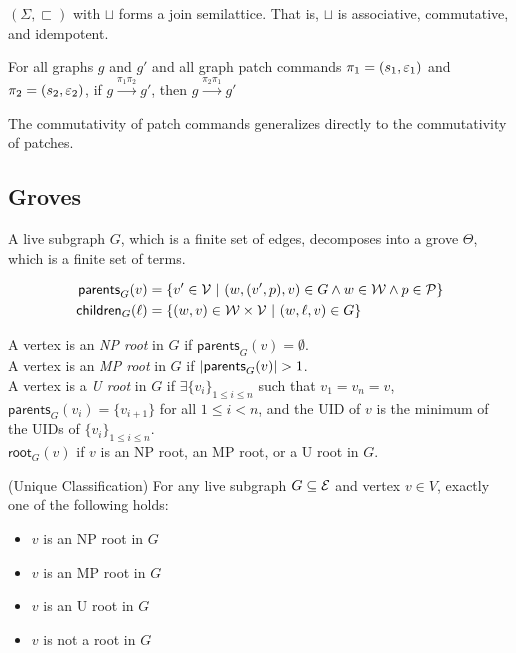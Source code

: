 \begin{lemma}
  \label{lem:Join Semilattice}
  $(\Sigma, \sqsubset)$ with $\sqcup$ forms a join semilattice. That is, $\sqcup$ is associative, commutative, and idempotent. 
\end{lemma}

\begin{theorem}[Commutativity]
  \label{thm:Commutativity}
  For all graphs $g$ and $g'$ and all graph patch commands $\pi_1 = (s_1, \varepsilon_1)$ and  $\pi_2 = (s_2, \varepsilon_2)$, 
  if $g \overset{\pi_1 \pi_2}{\longrightarrow} g'$,
  then $g \overset{\pi_2 \pi_1}{\longrightarrow} g'$
\end{theorem}

The commutativity of patch commands generalizes directly to the commutativity of patches. 

\subsection{Groves}

\figureTermSyntaxContent

A live subgraph $G$, which is a finite set of edges, decomposes into a grove $\Theta$, which is a finite set of terms.


\begin{align*}
    \mathsf{parents}_{G}(v) &= \left\{v' \in \mathcal{V} ~\vert~(w, (v', p), v) \in G \land w \in \mathcal{W} \land p \in \mathcal{P}\right\}\\
    \mathsf{children}_{G}(\ell) &= \left\{(w,v) \in \mathcal{W}\times\mathcal{V} ~\vert~(w, \ell, v) \in G\right\}
\end{align*}


A vertex is an \textit{NP root} in $G$ if $\mathsf{parents}_{G}(v)=\emptyset$.\\

A vertex is an \textit{MP root} in $G$ if $\left\lvert\mathsf{parents}_{G}(v)\right\rvert > 1$.\\

A vertex is a \textit{U root} in $G$ if $\exists \{v_i\}_{1 \leq i \leq n}$ such that $v_1 = v_n = v$, $\mathsf{parents}_{G}(v_i)=\{v_{i+1}\}$ for all $1 \leq i < n$, and the UID of $v$ is the minimum of the UIDs of $\{v_i\}_{1 \leq i \leq n}$.\\ 

$\mathsf{root}_G(v)$ if $v$ is an NP root, an MP root, or a U root in $G$.


\begin{lemma}
\label{lem:uniq-classification}
    (Unique Classification) For any live subgraph $G\subseteq \mathcal{E}$ and vertex $v\in V$, exactly one of the following holds: 
    \begin{itemize}
        \item $v$ is an NP root in $G$
        \item $v$ is an MP root in $G$
        \item $v$ is an U root in $G$
        \item $v$ is not a root in $G$
    \end{itemize}
\end{lemma}


